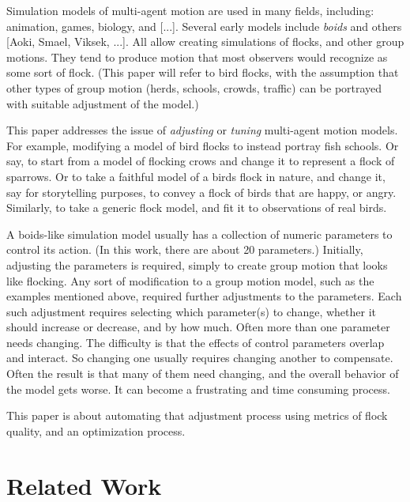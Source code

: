 \documentclass[letterpaper]{article}
\begin{document}
Simulation models of multi-agent motion are used in many fields, including: animation, games, biology, and [...]. Several early models include \textit{boids} \citep{reynolds_flocks_1987} and others [Aoki, Smael, Viksek, ...]. All allow creating simulations of flocks, and other group motions.  They tend to produce motion that most observers would recognize as some sort of flock. (This paper will refer to bird flocks, with the assumption that other types of group motion (herds, schools, crowds, traffic) can be portrayed with suitable adjustment of the model.)
\par

This paper addresses the issue of \textit{adjusting} or \textit{tuning} multi-agent motion models. For example, modifying a model of bird flocks to instead portray fish schools. Or say, to start from a model of flocking crows and change it to represent a flock of sparrows. Or to take a faithful model of a birds flock in nature, and change it, say for storytelling purposes, to convey a flock of birds that are happy, or angry. Similarly, to take a generic flock model, and fit it to observations of real birds.
\par

A boids-like simulation model usually has a collection of numeric parameters to control its action. (In this work, there are about 20 parameters.) Initially, adjusting the parameters is required, simply to create group motion that looks like flocking. Any sort of modification to a group motion model, such as the examples mentioned above, required further adjustments to the parameters. Each such adjustment requires selecting which parameter(s) to change, whether it should increase or decrease, and by how much. Often more than one parameter needs changing. The difficulty is that the effects of control parameters overlap and interact. So changing one usually requires changing another to compensate. Often the result is that many of them need changing, and the overall behavior of the model gets worse. It can become a frustrating and time consuming process.
\par

This paper is about automating that adjustment process using metrics of flock quality, and an optimization process.

\section{Related Work}
\label{sec:related}
\end{document}
